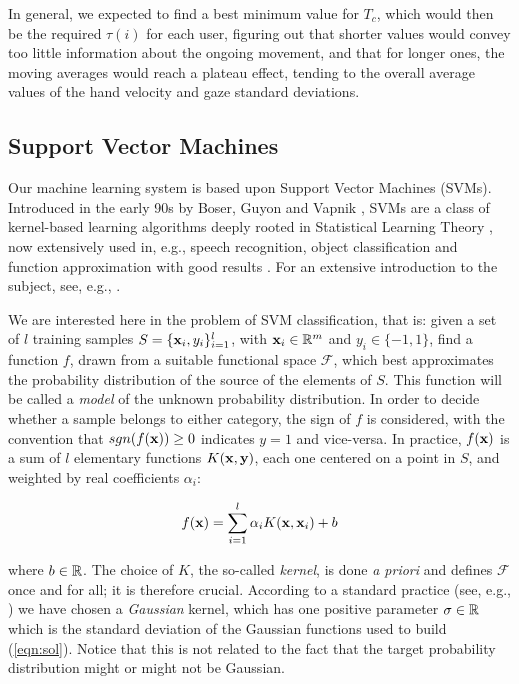 In general, we expected to find a best minimum value for $T_c$, which
would then be the required $\tau(i)$ for each user, figuring out that
shorter values would convey too little information about the ongoing
movement, and that for longer ones, the moving averages would reach a
plateau effect, tending to the overall average values of the hand
velocity and gaze standard deviations.

\subsection{Support Vector Machines}
\label{subsec:svm}

Our machine learning system is based upon Support Vector Machines
(SVMs). Introduced in the early 90s by Boser, Guyon and Vapnik
\cite{BGV92}, SVMs are a class of kernel-based learning algorithms
deeply rooted in Statistical Learning Theory \cite{v-edbed-82}, now
extensively used in, e.g., speech recognition, object classification
and function approximation with good results \cite{Cristianini00}. For
an extensive introduction to the subject, see, e.g., \cite{Burges98}.

We are interested here in the problem of SVM classification, that is:
given a set of $l$ training samples $S=\{\mathbf{x}_i,y_i\}_{i=1}^l$, with
$\mathbf{x}_i \in \mathbb{R}^m$ and $y_i \in \{-1,1\}$, find a function $f$, drawn
from a suitable functional space $\mathcal{F}$, which best
approximates the probability distribution of the source of the
elements of $S$. This function will be called a \emph{model} of the
unknown probability distribution. In order to decide whether a sample
belongs to either category, the sign of $f$ is considered, with the
convention that $sgn(f(\mathbf{x})) \geq 0$ indicates $y = 1$ and
vice-versa. In practice, $f(\mathbf{x})$ is a sum of $l$ elementary functions
$K(\mathbf{x},\mathbf{y})$, each one centered on a point in $S$, and weighted by
real coefficients $\alpha_i$:

\begin{equation} \label{eqn:sol}
  f(\mathbf{x}) = \sum_{i=1}^l \alpha_i K(\mathbf{x},\mathbf{x}_i) + b
\end{equation}

\noindent where $b \in \mathbb{R}$. The choice of $K$, the so-called
\emph{kernel}, is done \emph{a priori} and defines $\mathcal{F}$ once
and for all; it is therefore crucial. According to a standard practice
(see, e.g., \cite{Cristianini00}) we have chosen a \emph{Gaussian}
kernel, which has one positive parameter $\sigma \in \mathbb{R}$ which is the
standard deviation of the Gaussian functions used to build
(\ref{eqn:sol}). Notice that this is not related to the fact that the
target probability distribution might or might not be Gaussian.

